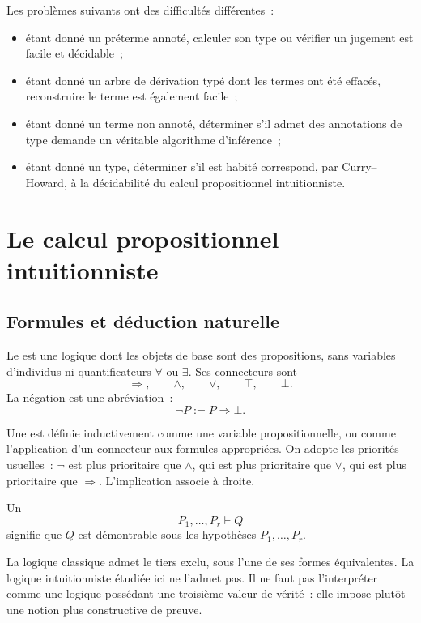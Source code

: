 \thingy Les problèmes suivants ont des difficultés différentes :
\begin{itemize}
\item étant donné un préterme annoté, calculer son type ou vérifier un
  jugement est facile et décidable ;
\item étant donné un arbre de dérivation typé dont les termes ont été
  effacés, reconstruire le terme est également facile ;
\item étant donné un terme non annoté, déterminer s'il admet des
  annotations de type demande un véritable algorithme d'inférence ;
\item étant donné un type, déterminer s'il est habité correspond, par
  Curry--Howard, à la décidabilité du calcul propositionnel
  intuitionniste.
\end{itemize}

\section{Le calcul propositionnel intuitionniste}

\subsection{Formules et déduction naturelle}

\thingy Le  est une logique dont les
objets de base sont des propositions, sans variables d'individus ni
quantificateurs $\forall$ ou $\exists$. Ses connecteurs sont
\[
\Rightarrow,\qquad \land,\qquad \lor,\qquad \top,\qquad \bot.
\]
La négation est une abréviation :
\[
\neg P:=P\Rightarrow\bot.
\]

Une  est définie inductivement comme
une variable propositionnelle, ou comme l'application d'un connecteur
aux formules appropriées. On adopte les priorités usuelles : $\neg$
est plus prioritaire que $\land$, qui est plus prioritaire que $\lor$,
qui est plus prioritaire que $\Rightarrow$. L'implication associe à
droite.

Un 
\[
P_1,\ldots,P_r\vdash Q
\]
signifie que $Q$ est démontrable sous les hypothèses
$P_1,\ldots,P_r$.

\thingy La logique classique admet le tiers exclu, sous l'une de ses
formes équivalentes. La logique intuitionniste étudiée ici ne l'admet
pas. Il ne faut pas l'interpréter comme une logique possédant une
troisième valeur de vérité : elle impose plutôt une notion plus
constructive de preuve.

